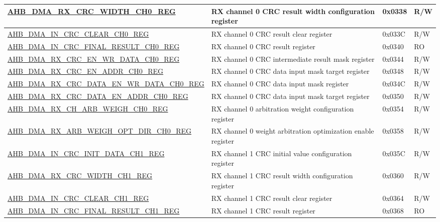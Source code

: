 \begin{longtable}{ | l | p{10cm} | p{1.3cm} | l | }
\hyperref[regdesc:AHBDMARXCRCWIDTHCHNREG]{AHB\_DMA\_RX\_CRC\_WIDTH\_CH0\_REG} & RX channel 0 CRC result width configuration register & 0x0338 & R/W \\ \hline
\hyperref[regdesc:AHBDMAINCRCCLEARCHNREG]{AHB\_DMA\_IN\_CRC\_CLEAR\_CH0\_REG} & RX channel 0 CRC result clear register & 0x033C & R/W \\ \hline
\hyperref[regdesc:AHBDMAINCRCFINALRESULTCHNREG]{AHB\_DMA\_IN\_CRC\_FINAL\_RESULT\_CH0\_REG} & RX channel 0 CRC result register & 0x0340 & RO \\ \hline
\hyperref[regdesc:AHBDMARXCRCENWRDATACHNREG]{AHB\_DMA\_RX\_CRC\_EN\_WR\_DATA\_CH0\_REG} & RX channel 0 CRC intermediate result mask register & 0x0344 & R/W \\ \hline
\hyperref[regdesc:AHBDMARXCRCENADDRCHNREG]{AHB\_DMA\_RX\_CRC\_EN\_ADDR\_CH0\_REG} & RX channel 0 CRC data input mask target register & 0x0348 & R/W \\ \hline
\hyperref[regdesc:AHBDMARXCRCDATAENWRDATACHNREG]{AHB\_DMA\_RX\_CRC\_DATA\_EN\_WR\_DATA\_CH0\_REG} & RX channel 0 CRC data input mask register & 0x034C & R/W \\ \hline
\hyperref[regdesc:AHBDMARXCRCDATAENADDRCHNREG]{AHB\_DMA\_RX\_CRC\_DATA\_EN\_ADDR\_CH0\_REG} & RX channel 0 CRC data input mask target register & 0x0350 & R/W \\ \hline
\hyperref[regdesc:AHBDMARXCHARBWEIGHCHNREG]{AHB\_DMA\_RX\_CH\_ARB\_WEIGH\_CH0\_REG} & RX channel 0 arbitration weight configuration register & 0x0354 & R/W \\ \hline
\hyperref[regdesc:AHBDMARXARBWEIGHOPTDIRCHNREG]{AHB\_DMA\_RX\_ARB\_WEIGH\_OPT\_DIR\_CH0\_REG} & RX channel 0 weight arbitration optimization enable register & 0x0358 & R/W \\ \hline
\hyperref[regdesc:AHBDMAINCRCINITDATACHNREG]{AHB\_DMA\_IN\_CRC\_INIT\_DATA\_CH1\_REG} & RX channel 1 CRC initial value configuration register & 0x035C & R/W \\ \hline
\hyperref[regdesc:AHBDMARXCRCWIDTHCHNREG]{AHB\_DMA\_RX\_CRC\_WIDTH\_CH1\_REG} & RX channel 1 CRC result width configuration register & 0x0360 & R/W \\ \hline
\hyperref[regdesc:AHBDMAINCRCCLEARCHNREG]{AHB\_DMA\_IN\_CRC\_CLEAR\_CH1\_REG} & RX channel 1 CRC result clear register & 0x0364 & R/W \\ \hline
\hyperref[regdesc:AHBDMAINCRCFINALRESULTCHNREG]{AHB\_DMA\_IN\_CRC\_FINAL\_RESULT\_CH1\_REG} & RX channel 1 CRC result register & 0x0368 & RO \\ \hline

\end{longtable}
